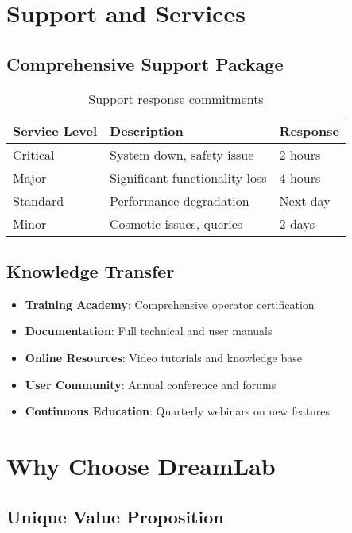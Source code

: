 \section{Support and Services}

\subsection{Comprehensive Support Package}

\begin{table}[H]
\centering
\begin{tabularx}{\textwidth}{@{}lXl@{}}
\toprule
\textbf{Service Level} & \textbf{Description} & \textbf{Response} \\
\midrule
Critical & System down, safety issue & 2 hours \\
Major & Significant functionality loss & 4 hours \\
Standard & Performance degradation & Next day \\
Minor & Cosmetic issues, queries & 2 days \\
\bottomrule
\end{tabularx}
\caption{Support response commitments}
\end{table}

\subsection{Knowledge Transfer}

\begin{itemize}
    \item \textbf{Training Academy}: Comprehensive operator certification
    \item \textbf{Documentation}: Full technical and user manuals
    \item \textbf{Online Resources}: Video tutorials and knowledge base
    \item \textbf{User Community}: Annual conference and forums
    \item \textbf{Continuous Education}: Quarterly webinars on new features
\end{itemize}

\section{Why Choose DreamLab}

\subsection{Unique Value Proposition}

